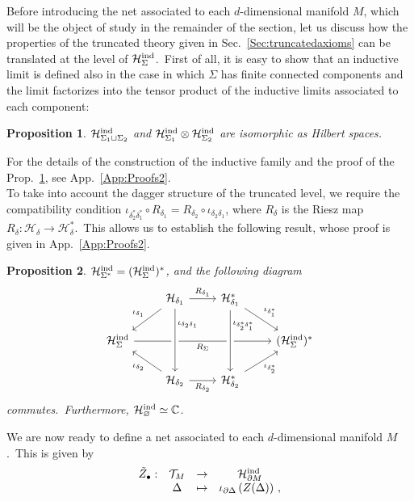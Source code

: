 \documentclass[11pt]{article}
\newcommand{\C}{\mathbb{C}}
\newcommand{\Hil}{\mathcal{H}}
\newcommand{\del}{\partial}
\newcommand{\h}{\mathcal{H}}
\newtheorem{proposition}{Proposition}[section]
\theoremstyle{definition}
\numberwithin{equation}{section}
\begin{document}
Before introducing the net associated to each $d$-dimensional manifold $M$, which will be the object of study in the remainder of the section, let us discuss how the properties of the truncated theory given in Sec.~\ref{Sec:truncatedaxioms} can be translated at the level of $\h_{\Sigma}^{\rm ind}$.~First of all, it is easy to show that an inductive limit is defined also in the case in which $\Sigma$ has finite connected components and the limit factorizes into the tensor product of the inductive limits associated to each component:
\begin{proposition}
\label{prop:factor}
    $\h_{\Sigma_1\sqcup\Sigma_2}^{\rm ind}$ and $\h_{\Sigma_1}^{\rm ind}\otimes\h_{\Sigma_2}^{\rm ind}$ are isomorphic as Hilbert spaces.
\end{proposition}
For the details of the construction of the inductive family and the proof of the Prop.~\ref{prop:factor}, see App.~\ref{App:Proofs2}.\\
To take into account the dagger structure of the truncated level, we require the compatibility condition $\iota_{\delta_2^*\delta_1^*}\circ R_{\delta_1}=R_{\delta_2}\circ \iota_{\delta_2\delta_1}$, where $R_\delta$ is the Riesz map $R_\delta:\h_\delta\to \h^*_\delta$.~This allows us to establish the following result, whose proof is given in App.~\ref{App:Proofs2}.
\begin{proposition}
\label{prop:dual}
    $\h_{\Sigma^*}^{\rm ind}= (\h_{\Sigma}^{\rm ind})^*$, and the following diagram
    \begin{equation}
    \label{dualcd}
    \begin{tikzcd} 
& \h_{\delta_1} \arrow{ld}[swap]{\iota_{\delta_1}} \arrow[r, "R_{\delta_1}"] &  \h_{\delta_1}^* \arrow[rd, "\iota_{\delta_1^*}"] & \\ 
      \h_{\Sigma}^{\rm ind} \arrow{rrr}[swap]{R_{\Sigma}}& & & (\h_{\Sigma}^{\rm ind})^*\\
       & \h_{\delta_2} \arrow[from=uu, crossing over, "\iota_{\delta_2\delta_1}" near start]\arrow[lu, "\iota_{\delta_2}"]\arrow{r}[swap]{R_{\delta_2}} &  \h_{\delta_2}^* \arrow{ru}[swap]{\iota_{\delta_2^*}} \arrow[from=uu, crossing over, "\iota_{\delta_2^*\delta_1^*}" near start]&  
    \end{tikzcd}
\end{equation}
commutes.~Furthermore, $\h_{\varnothing}^{\rm ind}\simeq \C$.
\end{proposition}
We are now ready to define a net associated to each $d$-dimensional manifold $M$.~This is given by
\begin{equation}
\label{eq:ind-net}
\begin{matrix}
    \tilde{Z}_\bullet:& \mathcal{T}_M &\to & \Hil^{\rm ind}_{\del M}\\
     & \Delta &\mapsto &\iota_{\del\Delta}\left(Z(\Delta)\right)\,,
\end{matrix}
\end{equation}
\end{document}
